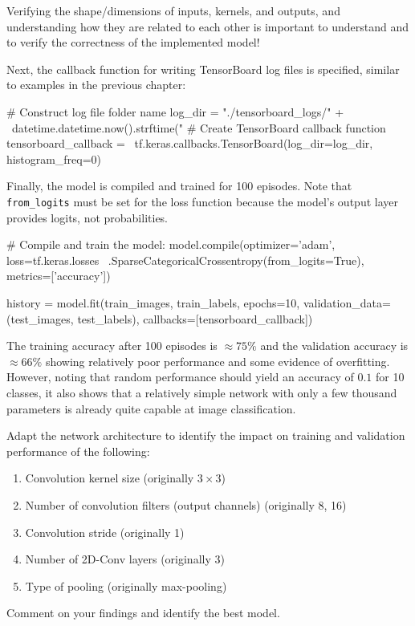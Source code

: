 \begin{withcode}
\begin{alertbox}
Verifying the shape/dimensions of inputs, kernels, and outputs, and understanding how they are related to each other is important to understand and to verify the correctness of the implemented model!
\end{alertbox}

Next, the callback function for writing TensorBoard log files is specified, similar to examples in the previous chapter:

\begin{pythoncode}
# Construct log file folder name
log_dir = "./tensorboard_logs/" + \
    datetime.datetime.now().strftime("%
# Create TensorBoard callback function
tensorboard_callback = \
    tf.keras.callbacks.TensorBoard(log_dir=log_dir, histogram_freq=0)
\end{pythoncode}

Finally, the model is compiled and trained for 100 episodes. Note that \texttt{from\_logits} must be set for the loss function because the model's output layer provides logits, not probabilities.

\begin{pythoncode}
# Compile and train the model:
model.compile(optimizer='adam',
    loss=tf.keras.losses \
        .SparseCategoricalCrossentropy(from_logits=True),
    metrics=['accuracy'])

history = model.fit(train_images, train_labels, 
    epochs=10, 
    validation_data=(test_images, test_labels),
    callbacks=[tensorboard_callback])
\end{pythoncode}

The training accuracy after 100 episodes is $\approx 75\%$ and the validation accuracy is $\approx 66\%$ showing relatively poor performance and some evidence of overfitting. However, noting that random performance should yield an accuracy of $0.1$ for 10 classes, it also shows that a relatively simple network with only a few thousand parameters is already quite capable at image classification. 

\begin{exerciseboxcomputer}
Adapt the network architecture to identify the impact on training and validation performance of the following:
   \begin{enumerate}
      \item Convolution kernel size (originally $3 \times 3$)
      \item Number of convolution filters (output channels) (originally 8, 16)
      \item Convolution stride (originally 1)
      \item Number of 2D-Conv layers (originally 3)
      \item Type of pooling (originally max-pooling)
   \end{enumerate} 
Comment on your findings and identify the best model.\\


\end{exerciseboxcomputer}
\end{withcode}
